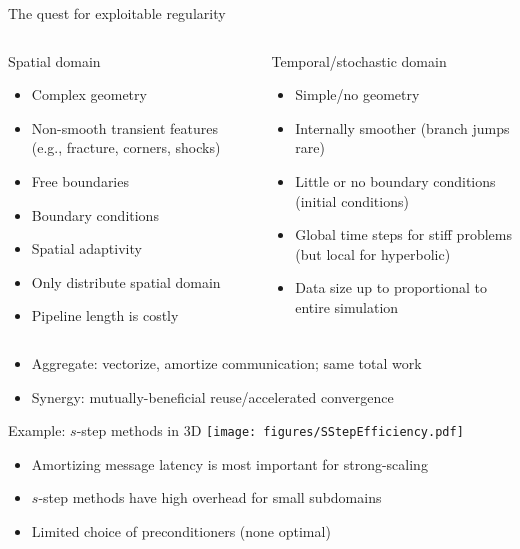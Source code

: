 \documentclass{beamer}
\begin{document}
\begin{frame}{The quest for exploitable regularity}
  \begin{columns}
    \begin{column}{0.5\textwidth}
      \begin{block}{Spatial domain}
        \begin{itemize}
        \item Complex geometry
        \item Non-smooth transient features (e.g., fracture, corners, shocks)
        \item Free boundaries
        \item Boundary conditions
        \item Spatial adaptivity
        \item Only distribute spatial domain
        \item Pipeline length is costly
        \end{itemize} 
      \end{block}
    \end{column}
    \begin{column}{0.5\textwidth}
      \begin{block}{Temporal/stochastic domain}
        \begin{itemize}
        \item Simple/no geometry
        \item Internally smoother (branch jumps rare)
        \item Little or no boundary conditions (initial conditions)
        \item Global time steps for stiff problems (but local for hyperbolic)
        \item Data size up to proportional to entire simulation
        \end{itemize}      
      \end{block}
    \end{column}
  \end{columns}
  \begin{itemize}
  \item<2> \alert{Aggregate:} vectorize, amortize communication; same total work
  \item<2> \alert{Synergy:} mutually-beneficial reuse/accelerated convergence
  \end{itemize}
\end{frame}

\begin{frame}{Example: $s$-step methods in 3D}
  \texttt{[image: figures/SStepEfficiency.pdf]}
  \begin{itemize}
  \item Amortizing message latency is most important for strong-scaling
  \item $s$-step methods have high overhead for small subdomains
  \item Limited choice of preconditioners (none optimal)
  \end{itemize}
\end{frame}
\end{document}
